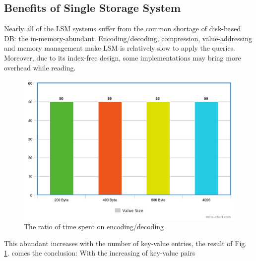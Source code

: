 \subsection{Benefits of Single Storage System}
Nearly all of the LSM systems suffer from the common shortage of disk-based DB: the in-memory-abundant. Encoding/decoding, compression, value-addressing and memory management make LSM is relatively slow to apply the queries. Moreover, due to its index-free design, some implementations may bring more overhead while reading.
\begin{figure}
	\centering
	\includegraphics[width=0.9\columnwidth]{fig/meta4}
	\caption{The ratio of time spent on encoding/decoding}
	\label{fig:entries_number}
\end{figure}

This abundant increases with the number of key-value entries, the result of Fig. \ref{fig:entries_number}. comes the conclusion: With the increasing of key-value pairs 


